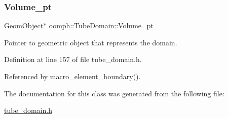 \subsubsection{\texorpdfstring{Volume\+\_\+pt}{Volume\_pt}}
{\footnotesize\ttfamily Geom\+Object$\ast$ oomph\+::\+Tube\+Domain\+::\+Volume\+\_\+pt\hspace{0.3cm}{\ttfamily [private]}}



Pointer to geometric object that represents the domain. 



Definition at line 157 of file tube\+\_\+domain.\+h.



Referenced by macro\+\_\+element\+\_\+boundary().



The documentation for this class was generated from the following file\+:\begin{DoxyCompactItemize}
\item 
\hyperlink{tube__domain_8h}{tube\+\_\+domain.\+h}\end{DoxyCompactItemize}
